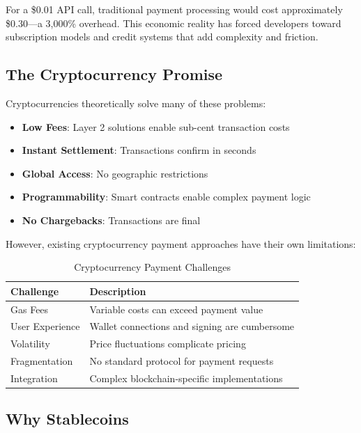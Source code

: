 \begin{infobox}
For a \$0.01 API call, traditional payment processing would cost approximately \$0.30---a 3,000\% overhead. This economic reality has forced developers toward subscription models and credit systems that add complexity and friction.
\end{infobox}

\subsection{The Cryptocurrency Promise}

Cryptocurrencies theoretically solve many of these problems:

\begin{itemize}
    \item \textbf{Low Fees}: Layer 2 solutions enable sub-cent transaction costs
    \item \textbf{Instant Settlement}: Transactions confirm in seconds
    \item \textbf{Global Access}: No geographic restrictions
    \item \textbf{Programmability}: Smart contracts enable complex payment logic
    \item \textbf{No Chargebacks}: Transactions are final
\end{itemize}

However, existing cryptocurrency payment approaches have their own limitations:

\begin{table}[htbp]
\centering
\caption{Cryptocurrency Payment Challenges}
\label{tab:crypto-challenges}
\begin{tabular}{l p{7cm}}
\toprule
\textbf{Challenge} & \textbf{Description} \\
\midrule
Gas Fees & Variable costs can exceed payment value \\
User Experience & Wallet connections and signing are cumbersome \\
Volatility & Price fluctuations complicate pricing \\
Fragmentation & No standard protocol for payment requests \\
Integration & Complex blockchain-specific implementations \\
\bottomrule
\end{tabular}
\end{table}

\subsection{Why Stablecoins}

